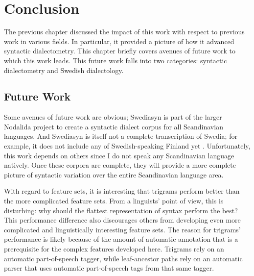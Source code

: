 \chapter{Conclusion}
\label{conclusion-chapter}

The previous chapter discussed the impact of this work with respect to
previous work in various fields. In particular, it provided a picture
of how it advanced syntactic dialectometry. This chapter briefly
covers avenues of future work to which this work leads. This future work falls
into two categories: syntactic dialectometry and Swedish
dialectology.

\section{Future Work}

Some avenues of future work are obvious; Swediasyn is part of the
larger Nodalida project to create a syntactic dialect corpus for all
Scandinavian languages. And Swediasyn is itself not a complete
transcription of Swedia; for example, it does not include any of
Swedish-speaking Finland yet \cite{johennessen09}. Unfortunately, this work depends on
others since I do not speak any Scandinavian language natively. Once
these corpora are complete, they will provide a more complete picture
of syntactic variation over the entire Scandinavian language area.

With regard to feature sets, it is interesting that trigrams perform better
than the more complicated feature sets. From a linguists' point of
view, this is disturbing: why should the flattest representation of
syntax perform the best? This performance difference also
discourages others from developing even more complicated and
linguistically interesting feature sets. The reason for trigrams'
performance is likely because of the amount of automatic annotation
that is a prerequisite for the complex features developed
here. Trigrams rely on an automatic part-of-speech tagger, while
leaf-ancestor paths rely on an automatic parser that uses automatic
part-of-speech tags from that same tagger.

